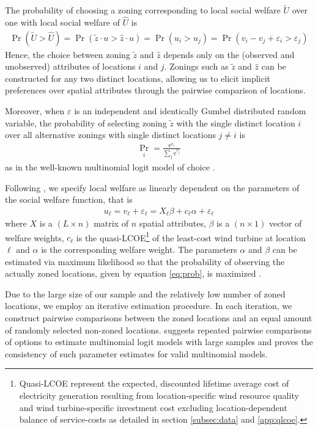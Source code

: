 \documentclass[review, a4paper, 12pt, authoryear, times]{elsarticle}
\begin{document}
The probability of choosing a zoning corresponding to local social welfare $\widetilde{U}$ over one with local social welfare of $\hat{U}$ is
\begin{align}
    \Pr(\widetilde{U} > \hat{U}) = \Pr(\widetilde{z} \cdot u > \hat{z} \cdot u) = \Pr(u_i > u_j) = \Pr(v_i - v_j + \varepsilon_i > \varepsilon_j)
\end{align}
Hence, the choice between zoning $\widetilde{z}$ and $\hat{z}$ depends only on the (observed and unobserved) attributes of locations $i$ and $j$.
Zonings such as $\widetilde{z}$ and $\hat{z}$ can be constructed for any two distinct locations, allowing us to elicit implicit preferences over spatial attributes through the pairwise comparison of locations.

Moreover, when $\varepsilon$ is an independent and identically Gumbel distributed random variable, the probability of selecting zoning $\widetilde{z}$ with the single distinct location $i$ over all alternative zonings with single distinct locations $j \neq i$ is 
\begin{align}
    \Pr_{i} = \frac{\mathrm{e}^{v_{i}}}{\sum_{j} \mathrm{e}^{v_j}} \label{eq:prob}
\end{align}
as in the well-known multinomial logit model of choice \citep{McFadden1974}.

Following \cite{Train2005}, we specify local welfare as linearly dependent on the parameters of the social welfare function, that is
\begin{align} \label{eq:socpref}
    u_{\ell} = v_{\ell} + \varepsilon_{\ell} = X_{\ell} \beta + c_{\ell} \alpha + \varepsilon_{\ell}
\end{align}
where $X$ is a $(L \times n)$ matrix of $n$ spatial attributes, $\beta$ is a $(n \times 1)$ vector of welfare weights, $c_{\ell}$ is the quasi-LCOE\footnote{Quasi-LCOE represent the expected, discounted lifetime average cost of electricity generation resulting from location-specific wind resource quality and wind turbine-specific investment cost excluding location-dependent balance of service-costs as detailed in section \ref{subsec:data} and \ref{app:qlcoe}.} of the least-cost wind turbine at location $\ell$ and $\alpha$ is the corresponding welfare weight.
The parameters $\alpha$ and $\beta$ can be estimated via maximum likelihood so that the probability of observing the actually zoned locations, given by equation \eqref{eq:prob}, is maximized \citep{McFadden1974, Train2009}.

Due to the large size of our sample and the relatively low number of zoned locations, we employ an iterative estimation procedure.
In each iteration, we construct pairwise comparisons between the zoned locations and an equal amount of randomly selected non-zoned locations.
\cite{McFadden1978} suggests repeated pairwise comparisons of options to estimate multinomial logit models with large samples and proves the consistency of such parameter estimates for valid multinomial models.
\end{document}
